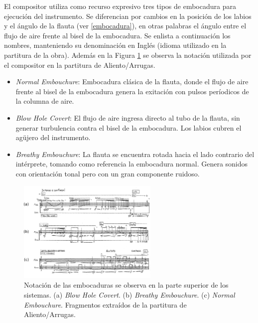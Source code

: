 \documentclass{article}
\begin{document}
El compositor utiliza como recurso expresivo tres tipos de embocadura para ejecución del instrumento. Se diferencian por cambios en la posición de los labios y el ángulo de la flauta (ver \ref{embocadura}), en otras palabras el ángulo entre el flujo de aire frente al bisel de la embocadura. Se enlista a continuación los nombres, manteniendo su denominación en Inglés (idioma utilizado en la partitura de la obra). Además en la Figura \ref{fig:embocaduras} se observa la notación utilizada por el compositor en la partitura de Aliento/Arrugas.

\begin{itemize}
  \item \textit{Normal Embouchure}: Embocadura clásica de la flauta, donde el flujo de aire frente al bisel de la embocadura genera la exitación con pulsos períodicos de la columna de aire. 
  \item \textit{Blow Hole Covert}: El flujo de aire ingresa directo al tubo de la flauta, sin generar turbulencia contra el bisel de la embocadura. Los labios cubren el agüjero del instrumento.
  \item \textit{Breathy Embouchure}: La flauta se encuentra rotada hacia el lado contrario del intérprete, tomando como referencia la embocadura normal. Genera sonidos con orientación tonal pero con un gran componente ruidoso.
\end{itemize}
\medskip

\begin{figure}[H]
\begin{center}
\includegraphics[width=0.6\textwidth]{embocaduras} 
\caption{Notación de las embocaduras se observa en la parte superior de los sistemas. (a) \textit{Blow Hole Covert}. (b) \textit{Breathy Embouchure}. (c) \textit{Normal Embouchure}. Fragmentos extraídos de la partitura de Aliento/Arrugas.}
\label{fig:embocaduras}
\end{center}
\end{figure}
\end{document}
